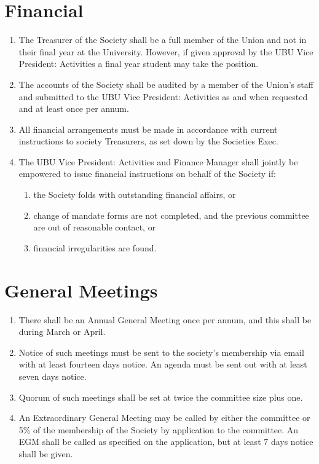 \documentclass[a4paper,10pt]{article}
\begin{document}
\section{Financial}
\begin{enumerate}
  \item The Treasurer of the Society shall be a full member of the Union and not in their final year at the University. However, if given approval by the UBU Vice President: Activities a final year student may take the position.
  \item The accounts of the Society shall be audited by a member of the Union's staff and submitted to the UBU Vice President: Activities as and when requested and at least once per annum.
  \item All financial arrangements must be made in accordance with current instructions to society Treasurers, as set down by the Societies Exec.
  \item The UBU Vice President: Activities and Finance Manager shall jointly be empowered to issue financial instructions on behalf of the Society if:
  \begin{enumerate}
    \item the Society folds with outstanding financial affairs, or
    \item change of mandate forms are not completed, and the previous committee are out of reasonable contact, or
    \item financial irregularities are found.
  \end{enumerate}
\end{enumerate}

\section{General Meetings}
\begin{enumerate}
  \item There shall be an Annual General Meeting once per annum, and this shall be during March or April.
  \item Notice of such meetings must be sent to the society's membership via email with at least fourteen days notice. An agenda must be sent out with at least seven days notice.
  \item Quorum of such meetings shall be set at twice the committee size plus one.
  \item An Extraordinary General Meeting may be called by either the committee or 5\% of the membership of the Society by application to the committee. An EGM shall be called as specified on the application, but at least 7 days notice shall be given.
\end{enumerate}
\end{document}
